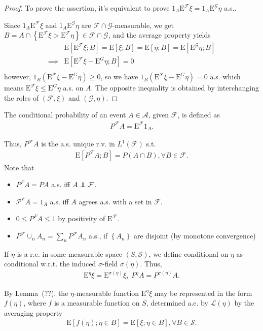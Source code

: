 \documentclass[12pt,a4paper]{article}
\newcommand{\E}{\mathop{\mathbb{E}}}
\def \E{\mbox{E}}
\def \A {\mathcal{A}}
\def \G {\mathcal{G}}
\def \L {\mathcal{L}}
\def \P {\mathcal{P}}
\def \S {\mathcal{S}}
\def \F {\mathcal{F}}
\newcommand\independent{\protect\mathpalette{\protect\independenT}{\perp}}
\def\independenT#1#2{\mathrel{\rlap{$#1#2$}\mkern2mu{#1#2}}}
\begin{document}
\begin{proof}
  To prove the assertion, it's equivalent to prove $1_A \E^{\F}\xi = 1_A \E^{\G}\eta$ a.s..

  Since $1_A \E^{\F}\xi$ and $1_A \E^{\G}\eta$ are $\F\cap\G$-measurable, we get $B=A\cap\left\{ \E^{\F}\xi > \E^{\F}\eta \right\} \in \F\cap\G$, and the average property yields
  \begin{align*}
    &\E\left[ \E^{\F}\xi;B \right] = \E[\xi;B] = \E\left[ \eta;B \right] = \E\left[ \E^{\G}\eta;B \right]\\
    \implies & \E\left[ \E^{\F}\xi - \E^{ G }\eta;B \right] =0 \\
  \end{align*}
  however, $1_{B}(\E^{\F}\xi - \E^{ G }\eta) \ge 0$, so we have $1_{B}(\E^{\F}\xi - \E^{ G }\eta) = 0$ a.s. which means $\E^{\F}\xi \le \E^{ G }\eta$ a.s. on $A$. The opposite inequality is obtained by interchanging the roles of $(\F,\xi)$ and $(\G,\eta)$.
\end{proof}

The conditional probability of an event $A\in\A$, given $\F$, is defined as
\begin{align*}
  P^{\F}A = \E^{\F} 1_A.
\end{align*}

Thus, $P^{\F}A $ is the a.s. unique r.v. in $L^1(\F)$ s.t.
\begin{align*}
  \E\left[ P^{\F}A;B \right] = P(A\cap B), \forall B\in\F.
\end{align*}
Note that
\begin{itemize}
  \item $P^{F}A = PA $ a.s. iff $A \independent \F$.
  \item $\P^{F}A = 1_A$ a.s. iff $A$ agrees a.s. with a set in $\F$.
  \item $0\le P^{F}A\le 1$ by positivity of $\E^{\F}$.
  \item $P^{\F}\cup_n A_n = \sum_n P^{\F}A_n$ a.s., if $\left\{ A_n \right\}$ are disjoint (by monotone convergence)
\end{itemize}

If $\eta$ is a r.e. in some measurable space $(S,\S)$, we define conditional on $\eta$ as conditional w.r.t. the induced $\sigma$-field $\sigma(\eta)$. Thus,
\begin{align*}
  \E^{\eta}\xi= \E^{\sigma(\eta)}\xi,\; P^{\eta}A = P^{\sigma(\eta)}A.
\end{align*}

By Lemma~(??), the $\eta$-measurable function $\E^{\eta}\xi$ may be represented in the form $f(\eta)$, where $f$ is a measurable function on $S$, determined a.e. by $\L(\eta)$ by the averaging property
\begin{align*}
  \E\left[ f(\eta);\eta\in B \right] = \E\left[ \xi;\eta\in B \right],\forall B \in \S.
\end{align*}
\end{document}
